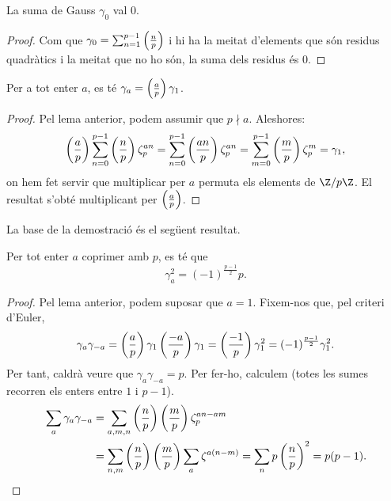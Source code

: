 \begin{lemma}
La suma de Gauss $\gamma_0$ val $0$.
\end{lemma}
\begin{proof}
Com que $\gamma_0=\sum_{n=1}^{p-1} \left(\frac{n}{p}\right)$ i hi ha la meitat d'elements que són residus quadràtics i la meitat que no ho són, la suma dels residus és $0$.
\end{proof}

\begin{lemma}
Per a tot enter $a$, es té $\gamma_a=\left(\frac{a}{p}\right)\gamma_1$.
\end{lemma}
\begin{proof}
Pel lema anterior, podem assumir que $p\nmid a$. Aleshores:
\[
\left(\frac{a}{p}\right)\sum_{n=0}^{p-1} \left(\frac{n}{p}\right) \zeta_{p}^{an}= \sum_{n=0}^{p-1} \left(\frac{an}{p}\right)\zeta_p^{an} = \sum_{m=0}^{p-1} \left(\frac{m}{p}\right)\zeta_p^m = \gamma_1,
\]
on hem fet servir que multiplicar per $a$ permuta els elements de $\Z/p\Z$. El resultat s'obté multiplicant per $\left(\frac{a}{p}\right)$.
\end{proof}

La base de la demostració és el següent resultat.
\begin{proposition}
Per tot enter $a$ coprimer amb $p$, es té que
 \[
 \gamma_a^2 = (-1)^{\frac{p-1}{2}} p.
 \]
\end{proposition}
\begin{proof}
 Pel lema anterior, podem suposar que $a=1$. Fixem-nos que, pel criteri d'Euler,
 \[
 \gamma_a\gamma_{-a}=\left(\frac{a}{p}\right)\gamma_1\left(\frac{-a}{p}\right)\gamma_1=\left(\frac{-1}{p}\right)\gamma_1^2 = (-1)^{\frac{p-1}{2}} \gamma_1^2.
 \]
 Per tant, caldrà veure que $\gamma_a\gamma_{-a} = p$. Per fer-ho, calculem (totes les sumes recorren els enters entre $1$ i $p-1$).
 \begin{align*}
     \sum_a \gamma_a\gamma_{-a} &= \sum_{a,m,n} \left(\frac{n}{p}\right)\left(\frac{m}{p}\right)\zeta_p^{an-am}\\
     &=\sum_{n,m} \left(\frac{n}{p}\right) \left(\frac{m}{p}\right) \sum_{a} \zeta^{a(n-m)} = \sum_n p \left(\frac{n}{p}\right)^2 = p(p-1).
 \end{align*}
\end{proof}


